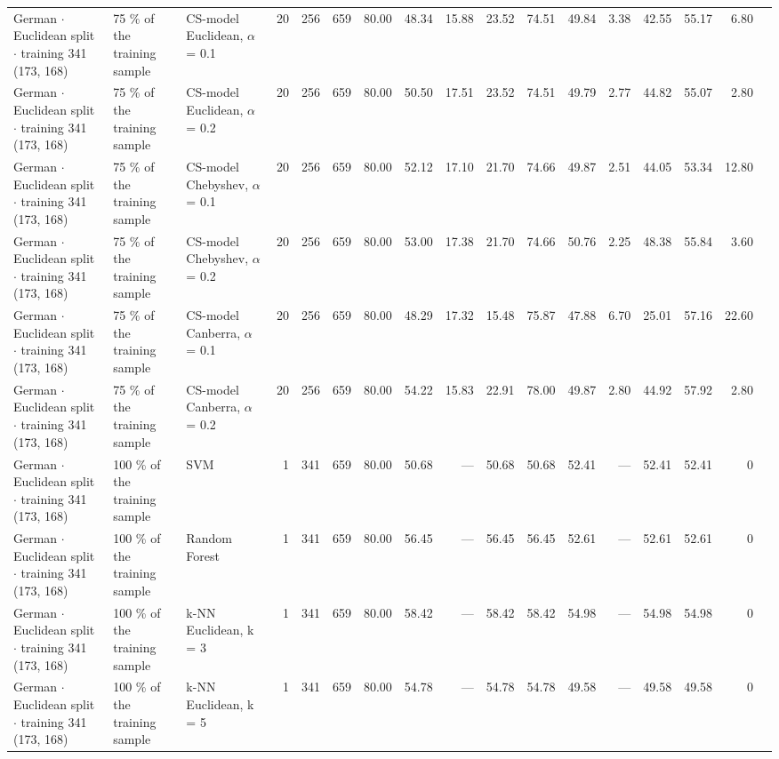 \begin{longtable}{lllrrrrrrrrrrrrrl}
  German $\cdot$ Euclidean split $\cdot$ training 341 (173, 168) & 75 \% of the training sample & CS-model Euclidean, $\alpha$ = 0.1 & 20 & 256 & 659 & 80.00 & 48.34 & 15.88 & 23.52 & 74.51 & 49.84 & 3.38 & 42.55 & 55.17 & 6.80 &  \\
  German $\cdot$ Euclidean split $\cdot$ training 341 (173, 168) & 75 \% of the training sample & CS-model Euclidean, $\alpha$ = 0.2 & 20 & 256 & 659 & 80.00 & 50.50 & 17.51 & 23.52 & 74.51 & 49.79 & 2.77 & 44.82 & 55.07 & 2.80 &  \\
  German $\cdot$ Euclidean split $\cdot$ training 341 (173, 168) & 75 \% of the training sample & CS-model Chebyshev, $\alpha$ = 0.1 & 20 & 256 & 659 & 80.00 & 52.12 & 17.10 & 21.70 & 74.66 & 49.87 & 2.51 & 44.05 & 53.34 & 12.80 &  \\
  German $\cdot$ Euclidean split $\cdot$ training 341 (173, 168) & 75 \% of the training sample & CS-model Chebyshev, $\alpha$ = 0.2 & 20 & 256 & 659 & 80.00 & 53.00 & 17.38 & 21.70 & 74.66 & 50.76 & 2.25 & 48.38 & 55.84 & 3.60 &  \\
  German $\cdot$ Euclidean split $\cdot$ training 341 (173, 168) & 75 \% of the training sample & CS-model Canberra, $\alpha$ = 0.1 & 20 & 256 & 659 & 80.00 & 48.29 & 17.32 & 15.48 & 75.87 & 47.88 & 6.70 & 25.01 & 57.16 & 22.60 &  \\
  German $\cdot$ Euclidean split $\cdot$ training 341 (173, 168) & 75 \% of the training sample & CS-model Canberra, $\alpha$ = 0.2 & 20 & 256 & 659 & 80.00 & 54.22 & 15.83 & 22.91 & 78.00 & 49.87 & 2.80 & 44.92 & 57.92 & 2.80 &  \\
  German $\cdot$ Euclidean split $\cdot$ training 341 (173, 168) & 100 \% of the training sample & SVM & 1 & 341 & 659 & 80.00 & 50.68 & --- & 50.68 & 50.68 & 52.41 & --- & 52.41 & 52.41 & 0 &  \\
  German $\cdot$ Euclidean split $\cdot$ training 341 (173, 168) & 100 \% of the training sample & Random Forest & 1 & 341 & 659 & 80.00 & 56.45 & --- & 56.45 & 56.45 & 52.61 & --- & 52.61 & 52.61 & 0 &  \\
  German $\cdot$ Euclidean split $\cdot$ training 341 (173, 168) & 100 \% of the training sample & k-NN Euclidean, k = 3 & 1 & 341 & 659 & 80.00 & 58.42 & --- & 58.42 & 58.42 & 54.98 & --- & 54.98 & 54.98 & 0 &  \\
  German $\cdot$ Euclidean split $\cdot$ training 341 (173, 168) & 100 \% of the training sample & k-NN Euclidean, k = 5 & 1 & 341 & 659 & 80.00 & 54.78 & --- & 54.78 & 54.78 & 49.58 & --- & 49.58 & 49.58 & 0 &  \\

\end{longtable}

